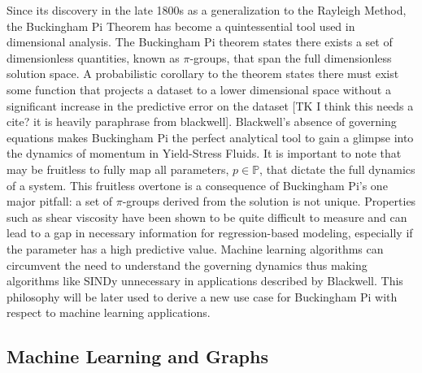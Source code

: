 \documentclass{article}
\theoremstyle{definition}
\begin{document}
Since its discovery in the late 1800s as a generalization to the Rayleigh Method, the Buckingham Pi Theorem has become a quintessential tool used in dimensional analysis.  The Buckingham Pi theorem states there exists a set of dimensionless quantities, known as $\pi$-groups, that span the full dimensionless solution space.  A probabilistic corollary to the theorem states there must exist some function that projects a dataset to a lower dimensional space without a significant increase in the predictive error on the dataset [TK I think this needs a cite? it is heavily paraphrase from blackwell].  Blackwell's absence of governing equations makes Buckingham Pi the perfect analytical tool to gain a glimpse into the dynamics of momentum in Yield-Stress Fluids.  It is important to note that may be fruitless to fully map all parameters, $p \in \mathbb{P}$, that dictate the full dynamics of a system.  This fruitless overtone is a consequence of Buckingham Pi's one major pitfall: a set of $\pi$-groups derived from the solution is not unique.  Properties such as shear viscosity have been shown to be quite difficult to measure and can lead to a gap in necessary information for regression-based modeling, especially if the parameter has a high predictive value.  Machine learning algorithms can circumvent the need to understand the governing dynamics thus making algorithms like SINDy unnecessary in applications described by Blackwell. This philosophy will be later used to derive a new use case for Buckingham Pi with respect to machine learning applications.

\subsection{Machine Learning and Graphs}
\end{document}
